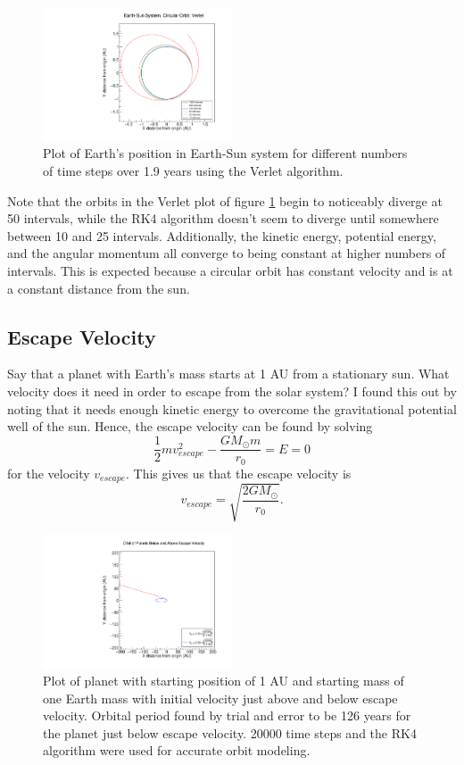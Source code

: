\documentclass[a4paper,12pt]{report}
\begin{document}
  \begin{figure}
 \centering
   \includegraphics[width=0.5\textwidth]{ESVerlet_position.pdf}
  \caption{Plot of Earth's position in Earth-Sun system for different numbers of time steps over 1.9 years using the Verlet algorithm.}
  \label{fig:ESVerlet_position}
 \end{figure}

 Note that the orbits in the Verlet plot of figure \ref{fig:ESVerlet_position} begin to noticeably diverge at 50 intervals, while the RK4 algorithm doesn't seem to diverge until somewhere between 10 and 25 intervals. Additionally, the kinetic energy, potential energy, and the angular momentum all converge to being constant at higher numbers of intervals. This is expected because a circular orbit has constant velocity and is at a constant distance from the sun.

\subsection{Escape Velocity}

Say that a planet with Earth's mass starts at 1 AU from a stationary sun. What velocity does it need in order to escape from the solar system? I found this out by noting that it needs enough kinetic energy to overcome the gravitational potential well of the sun. Hence, the escape velocity can be found by solving
\[
 \frac{1}{2}mv_{escape}^2-\frac{GM_\odot m}{r_0} = E = 0
\]
for the velocity $v_{escape}$. This gives us that the escape velocity is
\[
 v_{escape}=\sqrt{\frac{2GM_\odot}{r_0}}.
\]

 \begin{figure}
 \centering
   \includegraphics[width=0.5\textwidth]{Escape_plot.pdf}
  \caption{Plot of planet with starting position of 1 AU and starting mass of one Earth mass with initial velocity just above and below escape velocity. Orbital period found by trial and error to be 126 years for the planet just below escape velocity. 20000 time steps and the RK4 algorithm were used for accurate orbit modeling.}
  \label{fig:Escape}
 \end{figure}
\end{document}
